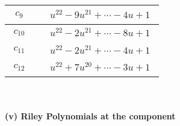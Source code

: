 \documentclass[1p]{elsarticle_modified}
\theoremstyle{definition}
\begin{document}
\begin{tabular}{m{50pt}|m{274pt}}
\hline $$\begin{aligned}c_{9}\end{aligned}$$&$\begin{aligned}
&u^{22}-9 u^{21}+\cdots-4 u+1
\end{aligned}$\\
\hline $$\begin{aligned}c_{10}\end{aligned}$$&$\begin{aligned}
&u^{22}-2 u^{21}+\cdots-8 u+1
\end{aligned}$\\
\hline $$\begin{aligned}c_{11}\end{aligned}$$&$\begin{aligned}
&u^{22}-2 u^{21}+\cdots-4 u+1
\end{aligned}$\\
\hline $$\begin{aligned}c_{12}\end{aligned}$$&$\begin{aligned}
&u^{22}+7 u^{20}+\cdots-3 u+1
\end{aligned}$\\
\hline
\end{tabular}\\~\\
\newpage\renewcommand{\arraystretch}{1}
\flushleft \textbf{(v) Riley Polynomials at the component}\newline \\
\end{document}
